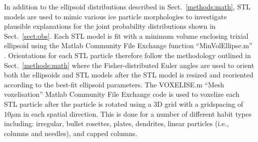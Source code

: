 \documentclass[amt, manuscript]{copernicus}
\begin{document}
In addition to the ellipsoid distributions described in Sect.~\ref{methods:math}, STL models are used to mimic various ice particle morphologies to investigate plausible explanations for the joint probability distributions shown in Sect.~\ref{sect:obs}. Each STL model is fit with a minimum volume enclosing trixial ellipsoid using the Matlab Community File Exchange function ``MinVolEllipse.m'' \citep{Moshtagh2024}. Orientations for each STL particle therefore follow the methodology outlined in Sect.~\ref{methods:math} where the Fisher-distributed Euler angles are used to orient both the ellipsoids and STL models after the STL model is resized and reoriented according to the best-fit ellipsoid parameters. The VOXELISE.m ``Mesh voxelisation'' Matlab Community File Exchange code \citep{Aitkenhead2024} is used to voxelize each STL particle after the particle is rotated using a 3D grid with a gridspacing of $10\mu$m in each spatial direction. This is done for a number of different habit types including: irregular, bullet rosettes, plates, dendrites, linear particles (i.e., columns and needles), and capped columns.
\end{document}
